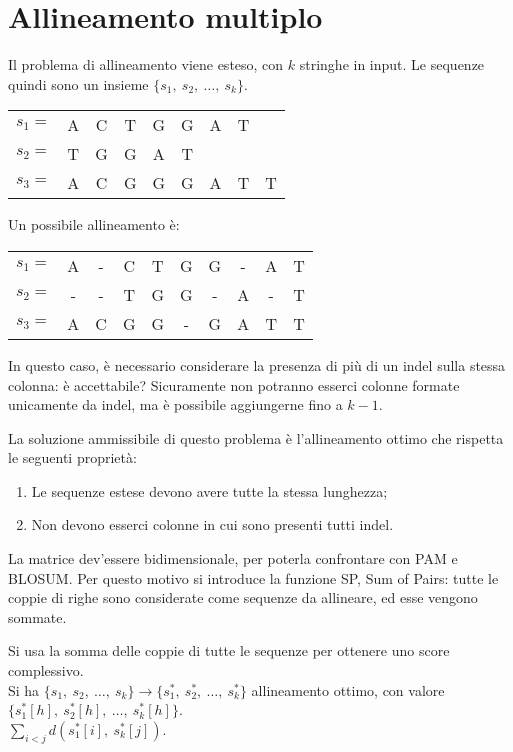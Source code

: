 \section{Allineamento multiplo}
Il problema di allineamento viene esteso, con $k$ stringhe in input. Le sequenze quindi sono un insieme $\{s_1,\ s_2,\ \dots,\ s_k\}$.

\begin{example}{}{}
\begin{tabular}{l *{8}{c}}
	$s_1 = $ & A & C & T & G & G & A & T & ~ \\
	$s_2 = $ & T & G & G & A & T & ~ & ~ & ~ \\
	$s_3 = $ & A & C & G & G & G & A & T & T
\end{tabular}

Un possibile allineamento è:

\begin{tabular}{l *{9}{c}}
	$s_1 = $ & A & - & C & T & G & G & - & A & T \\
	$s_2 = $ & - & - & T & G & G & - & A & - & T \\
	$s_3 = $ & A & C & G & G & - & G & A & T & T
\end{tabular}

In questo caso, è necessario considerare la presenza di più di un indel sulla stessa colonna: è accettabile? Sicuramente non potranno esserci colonne formate unicamente da indel, ma è possibile aggiungerne fino a $k - 1$.
\end{example}

La soluzione ammissibile di questo problema è l'allineamento ottimo che rispetta le seguenti proprietà:
\begin{enumerate}
	\item Le sequenze estese devono avere tutte la stessa lunghezza;
	\item Non devono esserci colonne in cui sono presenti tutti indel.
\end{enumerate}

La matrice dev'essere bidimensionale, per poterla confrontare con PAM e BLOSUM. Per questo motivo si introduce la funzione SP, Sum of Pairs: tutte le coppie di righe sono considerate come sequenze da allineare, ed esse vengono sommate. 

Si usa la somma delle coppie di tutte le sequenze per ottenere uno score complessivo. \\
Si ha $\{s_1,\ s_2,\ \dots,\ s_k\} \rightarrow \{s^{*}_1,\ s^{*}_2,\ \dots,\ s^{*}_k\}$ allineamento ottimo, con valore $\{s^{*}_1[h],\ s^{*}_2[h],\ \dots,\ s^{*}_k[h]\}$. \\
$\sum_{i<j}d(s^*_1[i],\ s^*_k[j])$.

